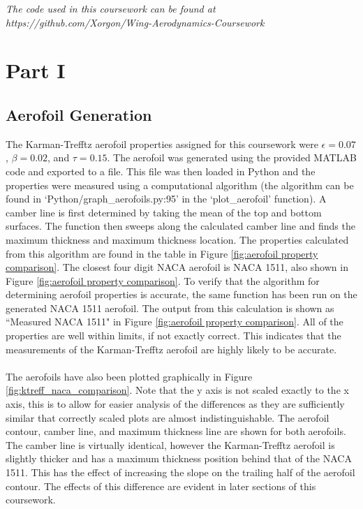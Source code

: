 \documentclass[10pt,a4paper]{article}
\author{Elijah Andrews}
\begin{document}
\textit{The code used in this coursework can be found at https://github.com/Xorgon/Wing-Aerodynamics-Coursework}
\section{Part I}
\subsection{Aerofoil Generation}
The Karman-Trefftz aerofoil properties assigned for this coursework were $\epsilon = 0.07$, $\beta = 0.02$, and $\tau = 0.15$. The aerofoil was generated using the provided MATLAB code and exported to a file. This file was then loaded in Python and the properties were measured using a computational algorithm (the algorithm can be found in `Python/graph\_aerofoils.py:95' in the `plot\_aerofoil' function). A camber line is first determined by taking the mean of the top and bottom surfaces. The function then sweeps along the calculated camber line and finds the maximum thickness and maximum thickness location. The properties calculated from this algorithm are found in the table in Figure \ref{fig:aerofoil property comparison}. The closest four digit NACA aerofoil is NACA 1511, also shown in Figure \ref{fig:aerofoil property comparison}. To verify that the algorithm for determining aerofoil properties is accurate, the same function has been run on the generated NACA 1511 aerofoil. The output from this calculation is shown as ``Measured NACA 1511" in Figure \ref{fig:aerofoil property comparison}. All of the properties are well within limits, if not exactly correct. This indicates that the measurements of the Karman-Trefftz aerofoil are highly likely to be accurate.
\\\\The aerofoils have also been plotted graphically in Figure \ref{fig:ktreff_naca_comparison}. Note that the y axis is not scaled exactly to the x axis, this is to allow for easier analysis of the differences as they are sufficiently similar that correctly scaled plots are almost indistinguishable. The aerofoil contour, camber line, and maximum thickness line are shown for both aerofoils. The camber line is virtually identical, however the Karman-Trefftz aerofoil is slightly thicker and has a maximum thickness position behind that of the NACA 1511. This has the effect of increasing the slope on the trailing half of the aerofoil contour. The effects of this difference are evident in later sections of this coursework.
\end{document}

